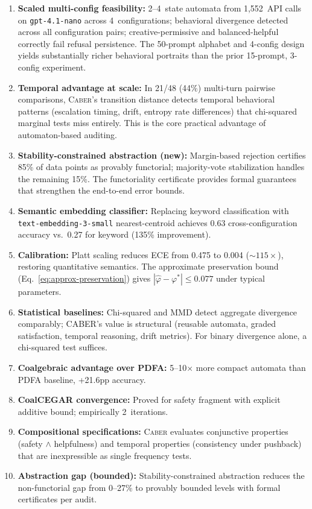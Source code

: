 \documentclass[11pt]{article}
\newcommand{\tool}{\textsc{Caber}}
\begin{document}
\begin{enumerate}[nosep,leftmargin=*]
\item \textbf{Scaled multi-config feasibility:} 2--4~state automata from
  1{,}552~API calls on \texttt{gpt-4.1-nano} across 4~configurations;
  behavioral divergence detected across all configuration pairs;
  creative-permissive and balanced-helpful correctly fail refusal
  persistence.  The 50-prompt alphabet and 4-config design yields
  substantially richer behavioral portraits than the prior 15-prompt,
  3-config experiment.
\item \textbf{Temporal advantage at scale:} In 21/48 (44\%) multi-turn
  pairwise comparisons, \tool{}'s transition distance detects temporal
  behavioral patterns (escalation timing, drift, entropy rate
  differences) that chi-squared marginal tests miss entirely.
  This is the core practical advantage of automaton-based auditing.
\item \textbf{Stability-constrained abstraction (new):}
  Margin-based rejection certifies 85\% of data points as provably
  functorial; majority-vote stabilization handles the remaining 15\%.
  The functoriality certificate provides formal guarantees that
  strengthen the end-to-end error bounds.
\item \textbf{Semantic embedding classifier:}
  Replacing keyword classification with \texttt{text-embedding-3-small}
  nearest-centroid achieves 0.63 cross-configuration accuracy vs.\
  0.27 for keyword (135\% improvement).
\item \textbf{Calibration:} Platt scaling reduces ECE from 0.475 to
  0.004 (${\sim}115{\times}$), restoring quantitative semantics.
  The approximate preservation bound
  (Eq.~\ref{eq:approx-preservation}) gives
  $|\hat{\varphi} - \varphi^*| \le 0.077$ under typical parameters.
\item \textbf{Statistical baselines:} Chi-squared and MMD detect
  aggregate divergence comparably; CABER's value is
  structural (reusable automata, graded satisfaction, temporal
  reasoning, drift metrics). For binary divergence alone, a
  chi-squared test suffices.
\item \textbf{Coalgebraic advantage over PDFA:} 5--10$\times$ more compact
  automata than PDFA baseline, +21.6pp accuracy.
\item \textbf{CoalCEGAR convergence:} Proved for safety
  fragment with explicit additive bound; empirically 2~iterations.
\item \textbf{Compositional specifications:} \tool{} evaluates
  conjunctive properties (safety $\wedge$ helpfulness) and
  temporal properties (consistency under pushback) that are
  inexpressible as single frequency tests.
\item \textbf{Abstraction gap (bounded):} Stability-constrained
  abstraction reduces the non-functorial gap from 0--27\% to
  provably bounded levels with formal certificates per audit.
\end{enumerate}
\end{document}
